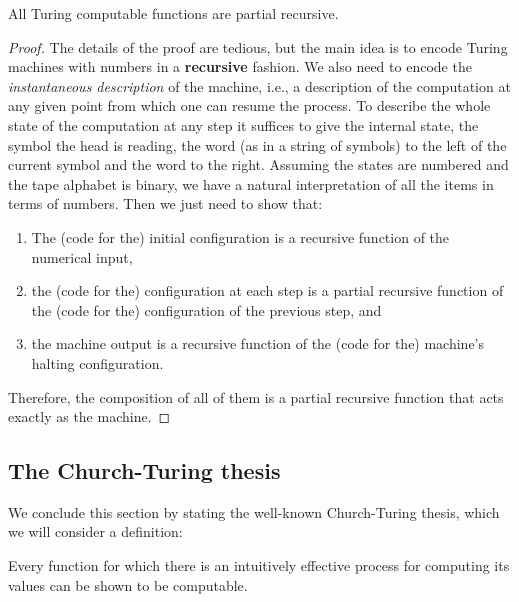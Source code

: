 \documentclass[../main.tex]{memoir}
\begin{document}
\begin{theorem}
  \label{thm:turing-implies-recursive}
  All Turing computable functions are partial recursive.
\end{theorem}
\begin{proof}
  The details of the proof are tedious, but the main idea is to encode Turing machines with numbers in a \textbf{recursive} fashion. We also need to encode the \textit{instantaneous description} of the machine, i.e., a description of the computation at any given point from which one can resume the process. To describe the whole state of the computation at any step it suffices to give the internal state, the symbol the head is reading, the word (as in a string of symbols) to the left of the current symbol and the word to the right. Assuming the states are numbered and the tape alphabet is binary, we have a natural interpretation of all the items in terms of numbers. Then we just need to show that:

  \begin{enumerate}
  \item The (code for the) initial configuration is a recursive function of the numerical input,
  \item the (code for the) configuration at each step is a partial recursive function of the (code for the) configuration of the previous step, and
  \item the machine output is a recursive function of the (code for the) machine's halting configuration.
  \end{enumerate}

  Therefore, the composition of all of them is a partial recursive function that acts exactly as the machine.
\end{proof}

\subsection{The Church-Turing thesis}

We conclude this section by stating the well-known Church-Turing thesis, which we will consider a definition:

\begin{definition}
  Every function for which there is an intuitively effective process for computing its values can be shown to be computable.
\end{definition}
\end{document}
